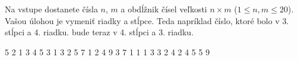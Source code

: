 




Na vstupe dostanete čísla $n$, $m$ a obdĺžnik čísel veľkosti $n\times m$ ($1\leq n,m \leq 20$).
Vašou úlohou je vymeniť riadky a stĺpce. Teda napríklad číslo, ktoré bolo v 3. stĺpci a 4. riadku.
bude teraz v 4. stĺpci a 3. riadku.

 5
2 1 3 4 5
3 1 3 2 5
7 1 2 4 9
 3 7
1 1 1
3 3 2
4 2 4
5 5 9
\koniec


